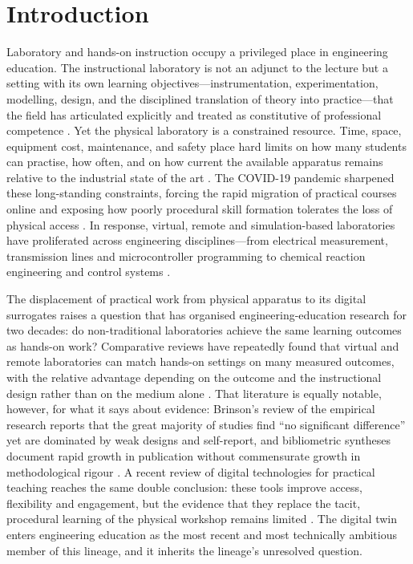 \section{Introduction}\label{introduction}

Laboratory and hands-on instruction occupy a privileged place in engineering
education. The instructional laboratory is not an adjunct to the lecture but a
setting with its own learning objectives---instrumentation, experimentation,
modelling, design, and the disciplined translation of theory into practice---that
the field has articulated explicitly and treated as constitutive of professional
competence \cite{feisel_role_2005,lei_teaching_2022,naukkarinen_supporting_2018}.
Yet the physical laboratory is a constrained resource. Time, space, equipment
cost, maintenance, and safety place hard limits on how many students can practise,
how often, and on how current the available apparatus remains relative to the
industrial state of the art \cite{lei_teaching_2022,prichetnikov_investigation_2020}.
The COVID-19 pandemic sharpened these long-standing constraints, forcing the rapid
migration of practical courses online and exposing how poorly procedural skill
formation tolerates the loss of physical access \cite{haase_teaching_2022,alkhedher_interactive_2021}. In response, virtual, remote and simulation-based
laboratories have proliferated across engineering disciplines---from electrical
measurement, transmission lines and microcontroller programming to chemical
reaction engineering and control systems \cite{chumchuen_remote_2023,andrieu_remote_2021,panagiotakis_remote_2022,naukkarinen_supporting_2018,lei_teaching_2022}.

The displacement of practical work from physical apparatus to its digital
surrogates raises a question that has organised engineering-education research for
two decades: do non-traditional laboratories achieve the same learning outcomes as
hands-on work? Comparative reviews have repeatedly found that virtual and remote
laboratories can match hands-on settings on many measured outcomes, with the
relative advantage depending on the outcome and the instructional design rather
than on the medium alone \cite{ma_handson_2006,corter_constructing_2007,lindsay_effects_2005,brinson_learning_2015}. That literature is equally
notable, however, for what it says about evidence: Brinson's review of the
empirical research reports that the great majority of studies find ``no significant
difference'' yet are dominated by weak designs and self-report, and bibliometric
syntheses document rapid growth in publication without commensurate growth in
methodological rigour \cite{brinson_learning_2015,heradio_virtual_2016,potkonjak_virtual_2016}. A recent review of digital technologies for practical
teaching reaches the same double conclusion: these tools improve access,
flexibility and engagement, but the evidence that they replace the tacit,
procedural learning of the physical workshop remains limited
\cite{maladzhi_digital_2025}. The digital twin enters engineering education as the
most recent and most technically ambitious member of this lineage, and it inherits
the lineage's unresolved question.

